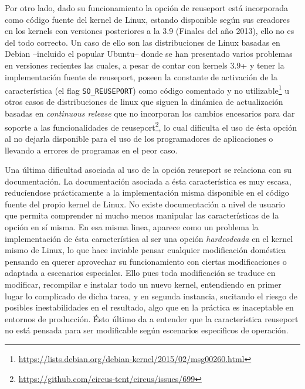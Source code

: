Por otro lado, dado su funcionamiento la opción de reuseport está incorporada como código fuente del kernel de Linux, estando disponible según sus creadores en los kernels con versiones posteriores a la 3.9 (Finales del año 2013), ello no es del todo correcto. Un caso de ello son las distribuciones de Linux basadas en Debian --incluido el popular Ubuntu-- donde se han presentado varios problemas en versiones recientes las cuales, a pesar de contar con kernels 3.9+ y tener la implementación fuente de reuseport, poseen la constante de activación de la característica (el flag \verb=SO_REUSEPORT=) como código comentado y no utilizable\footnote{\url{https://lists.debian.org/debian-kernel/2015/02/msg00260.html}} u otros casos de distribuciones de linux que siguen la dinámica de actualización basadas en \emph{continuous release} que no incorporan los cambios encesarios para dar soporte a las funcionalidades de reuseport\footnote{\url{https://github.com/circus-tent/circus/issues/699}}, lo cual dificulta el uso de ésta opción al no dejarla disponible para el uso de los programadores de aplicaciones o llevando a errores de programas en el peor caso.

Una última dificultad asociada al uso de la opción reuseport se relaciona con su documentación. La documentación asociada a ésta característica es muy escasa, reducíendose prácticamente a la implementación misma disponible en el código fuente del propio kernel de Linux. No existe documentación a nivel de usuario que permita comprender ni mucho menos manipular las características de la opción en sí misma. En esa misma linea, aparece como un problema la implementación de ésta característica al ser una opción \emph{hardcodeada} en el kernel mismo de Linux, lo que hace inviable pensar cualquier modificación doméstica pensando en querer aprovechar su funcionamiento con ciertas modificaciones o adaptada a escenarios especiales. Ello pues toda modificación se traduce en modificar, recompilar e instalar todo un nuevo kernel, entendiendo en primer lugar lo complicado de dicha tarea, y en segunda instancia, sucitando el riesgo de posibles inestabilidades en el resultado, algo que en la práctica es inaceptable en entornos de producción. Ésto último da a entender que la característica reuseport no está pensada para ser modificable según escenarios especificos de operación.